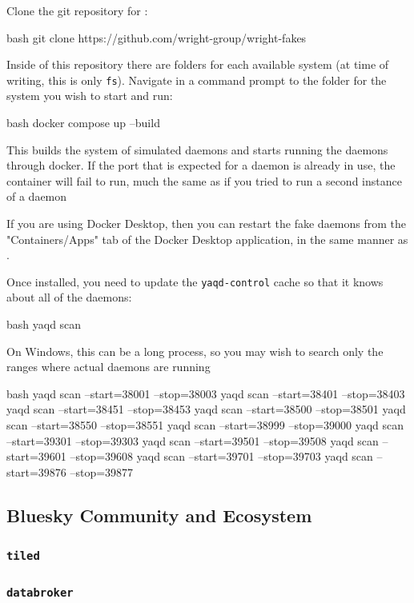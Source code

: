Clone the git repository for \wrightfakes:

\begin{codefragment}{bash}
git clone https://github.com/wright-group/wright-fakes
\end{codefragment}

Inside of this repository there are folders for each available system (at time of writing, this is only \texttt{fs}).
Navigate in a command prompt to the folder for the system you wish to start and run:

\begin{codefragment}{bash}
docker compose up --build
\end{codefragment}

This builds the system of simulated daemons and starts running the daemons through docker.
If the port that is expected for a \yaq daemon is already in use, the container will fail to run, much the same as if you tried to run a second instance of a \yaq daemon


If you are using Docker Desktop, then you can restart the fake daemons from the "Containers/Apps" tab of the Docker Desktop application, in the same manner as \biab.

Once installed, you need to update the \texttt{yaqd-control} cache so that it knows about all of the daemons:

\begin{codefragment}{bash}
yaqd scan
\end{codefragment}

On Windows, this can be a long process, so you may wish to search only the ranges where actual daemons are running

\begin{codefragment}{bash}
yaqd scan --start=38001 --stop=38003
yaqd scan --start=38401 --stop=38403
yaqd scan --start=38451 --stop=38453
yaqd scan --start=38500 --stop=38501
yaqd scan --start=38550 --stop=38551
yaqd scan --start=38999 --stop=39000
yaqd scan --start=39301 --stop=39303
yaqd scan --start=39501 --stop=39508
yaqd scan --start=39601 --stop=39608
yaqd scan --start=39701 --stop=39703
yaqd scan --start=39876 --stop=39877
\end{codefragment}

\subsection{Bluesky Community and Ecosystem}
\subsubsection{\texttt{tiled}}
\subsubsection{\texttt{databroker}}

\clearpage
